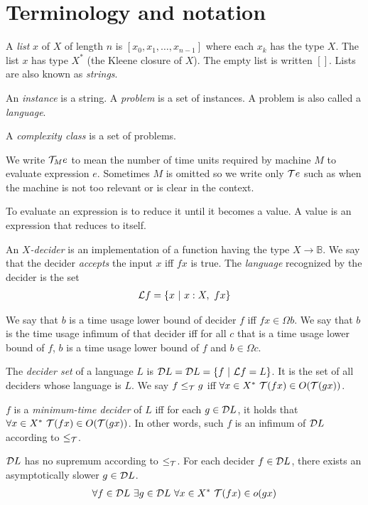 \section{Terminology and notation}

A \emph{list} $x$ of $X$ of length $n$ is $[x_0,x_1,\ldots,x_{n-1}]$
where each $x_k$ has the type $X$.
The list $x$ has type $X^*$ (the Kleene closure of $X$).
The empty list is written $[]$.
Lists are also known as \emph{strings}.

An \emph{instance} is a string.
A \emph{problem} is a set of instances.
A problem is also called a \emph{language}.

A \emph{complexity class} is a set of problems.

We write $\mathcal{T}_M e$ to mean the number of time units required by machine $M$
to evaluate expression $e$.
Sometimes $M$ is omitted so we write only $\mathcal{T} e$
such as when the machine is not too relevant
or is clear in the context.

To evaluate an expression is to reduce it until it becomes a value.
A value is an expression that reduces to itself.

An \emph{$X$-decider} is an implementation of a function having the type $X \to \mathbb B$.
We say that the decider \emph{accepts} the input $x$ iff $fx$ is true.
The \emph{language} recognized by the decider is the set
\begin{align*}
    \mathcal L f = \{ x ~|~ x : X, ~ fx \}
\end{align*}

We say that $b$ is a time usage lower bound of decider $f$ iff $fx \in \Omega b$.
We say that $b$ is the time usage infimum of that decider iff
for all $c$ that is a time usage lower bound of $f$,
$b$ is a time usage lower bound of $f$ and $b \in \Omega c$.

The \emph{decider set} of a language \(L\) is \(\mathcal D L = \mathcal D L = \{ f ~|~ \mathcal L f = L \}\).
It is the set of all deciders whose language is \(L\).
We say $f \le_{\mathcal{T}} g$ iff $\forall x \in X^* ~ \mathcal{T}(fx) \in O(\mathcal{T}(gx))$.

$f$ is a \emph{minimum-time decider} of $L$ iff for each $g \in \mathcal D L$,
it holds that $\forall x \in X^* ~ \mathcal{T}(fx) \in O(\mathcal{T}(gx))$.
In other words, such $f$ is an infimum of $\mathcal D L$ according to $\le_{\mathcal{T}}$.

\begin{msco}
    $\mathcal D L$ has no supremum according to $\le_{\mathcal{T}}$.
    For each decider $f \in \mathcal D L$, there exists an asymptotically slower $g \in \mathcal D L$.
    \begin{align}
        \forall f \in \mathcal D L ~ \exists g \in \mathcal D L ~ \forall x \in X^* ~ \mathcal{T}(fx) \in o(gx)
    \end{align}
\end{msco}

